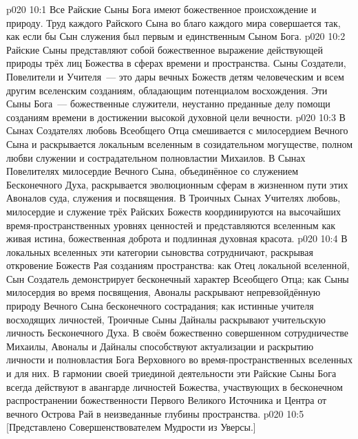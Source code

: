 \vs p020 10:1 Все Райские Сыны Бога имеют божественное происхождение и природу. Труд каждого Райского Сына во благо каждого мира совершается так, как если бы Сын служения был первым и единственным Сыном Бога.
\vs p020 10:2 Райские Сыны представляют собой божественное выражение действующей природы трёх лиц Божества в сферах времени и пространства. Сыны Создатели, Повелители и Учителя~--- это дары вечных Божеств детям человеческим и всем другим вселенским созданиям, обладающим потенциалом восхождения. Эти Сыны Бога~--- божественные служители, неустанно преданные делу помощи созданиям времени в достижении высокой духовной цели вечности.
\vs p020 10:3 В Сынах Создателях любовь Всеобщего Отца смешивается с милосердием Вечного Сына и раскрывается локальным вселенным в созидательном могуществе, полном любви служении и сострадательном полновластии Михаилов. В Сынах Повелителях милосердие Вечного Сына, объединённое со служением Бесконечного Духа, раскрывается эволюционным сферам в жизненном пути этих Авоналов суда, служения и посвящения. В Троичных Сынах Учителях любовь, милосердие и служение трёх Райских Божеств координируются на высочайших время\hyp{}пространственных уровнях ценностей и представляются вселенным как живая истина, божественная доброта и подлинная духовная красота.
\vs p020 10:4 В локальных вселенных эти категории сыновства сотрудничают, раскрывая откровение Божеств Рая созданиям пространства: как Отец локальной вселенной, Сын Создатель демонстрирует бесконечный характер Всеобщего Отца; как Сыны милосердия во время посвящения, Авоналы раскрывают непревзойдённую природу Вечного Сына бесконечного сострадания; как истинные учителя восходящих личностей, Троичные Сыны Дайналы раскрывают учительскую личность Бесконечного Духа. В своём божественно совершенном сотрудничестве Михаилы, Авоналы и Дайналы способствуют актуализации и раскрытию личности и полновластия Бога Верховного во время\hyp{}пространственных вселенных и для них. В гармонии своей триединой деятельности эти Райские Сыны Бога всегда действуют в авангарде личностей Божества, участвующих в бесконечном распространении божественности Первого Великого Источника и Центра от вечного Острова Рай в неизведанные глубины пространства.
\vsetoff
\vs p020 10:5 [Представлено Совершенствователем Мудрости из Уверсы.]
\quizlink
